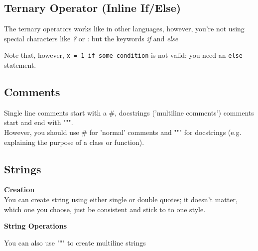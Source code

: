 
    \subsection{Ternary Operator (Inline If/Else)}
        The ternary operators works like in other languages, however, you're not using special
        characters like \textit{?} or \textit{:} but the keywords \textit{if} and \textit{else}

        Note that, however, \texttt{x = 1 if some_condition} is not valid; you need an
        \texttt{else} statement.

    \subsection{Comments}
        Single line comments start with a \#, docstrings ('multiline comments') comments start and
        end with """. \\
        However, you should use \# for 'normal' comments and """ for docstrings (e.g. explaining the
        purpose of a class or function).


    \subsection{Strings}

        \begin{indentblock}

            \textbf{Creation} \\
            You can create string using either single or double quotes;
            it doesn't matter, which one you choose, just be consistent and
            stick to to one style.

            \textbf{String Operations} \\

        \end{indentblock}

        You can also use """ to create multiline strings

